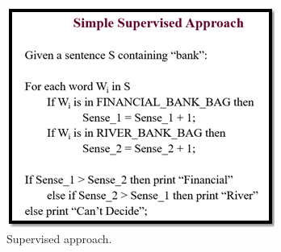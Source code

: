\begin{figure}[tbh]
	\begin{center}
		\includegraphics[width=\columnwidth]{union(sup3)}
	\end{center}
	\caption{Supervised approach. \label{fig}}
\end{figure}
